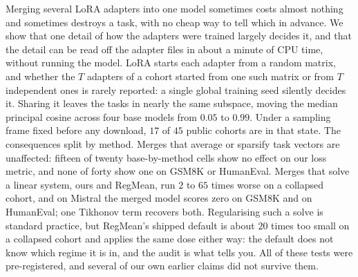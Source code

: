 Merging several LoRA adapters into one model sometimes costs almost
nothing and sometimes destroys a task, with no cheap way to tell which in
advance. We show that one detail of how the adapters were trained largely
decides it, and that the detail can be read off the adapter files in about
a minute of CPU time, without running the model. LoRA starts each adapter
from a random matrix, and whether the $T$ adapters of a cohort started from
one such matrix or from $T$ independent ones is rarely reported: a single
global training seed silently decides it. Sharing it leaves the tasks in
nearly the same subspace, moving the median principal cosine across four
base models from $0.05$ to $0.99$. Under a sampling frame fixed before any
download, $17$ of $45$ public cohorts are in that state. The consequences
split by method. Merges that average or sparsify task vectors are
unaffected: fifteen of twenty base-by-method cells show no effect on our
loss metric, and none of forty show one on GSM8K or HumanEval. Merges that
solve a linear system, ours and RegMean, run $2$ to $65$ times worse on a
collapsed cohort, and on Mistral the merged model scores zero on GSM8K and
on HumanEval; one Tikhonov term recovers both. Regularising such a solve is
standard practice, but RegMean's shipped default is about $20$ times too
small on a collapsed cohort and applies the same dose either way: the
default does not know which regime it is in, and the audit is what tells
you. All of these tests were pre-registered, and several of our own earlier
claims did not survive them.
